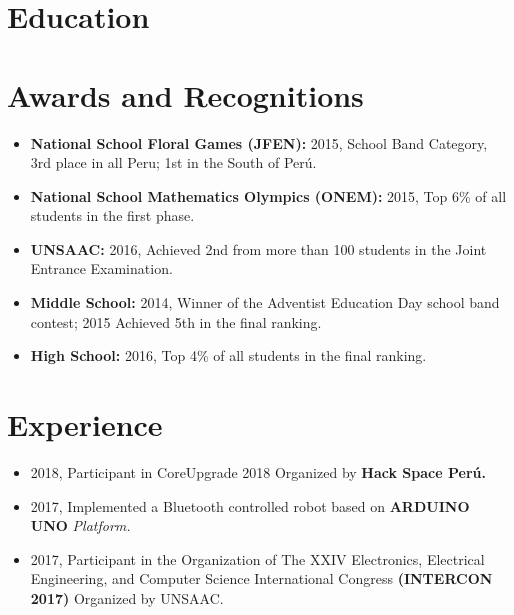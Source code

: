 \documentclass[11pt,a4paper,sans]{moderncv}        %
\begin{document}
\makecvtitle
\section{Education}



\section{Awards and Recognitions}
\begin{itemize}
\item{\textbf{National School Floral Games (JFEN): } 2015, School Band Category, 3rd place in all Peru; 1st in the South of Perú.}
\item{\textbf{National School Mathematics Olympics (ONEM): } 2015, Top 6\% of all students in the first phase.} 
\item{\textbf{UNSAAC: } 2016, Achieved 2nd from more than 100 students in the Joint Entrance Examination.}
\item{\textbf{Middle School: }2014, Winner of the Adventist Education Day school band contest; 2015 Achieved 5th in the final ranking.}
\item{\textbf{High School: } 2016, Top 4\% of all students in the final ranking.} 
\end{itemize}
\section{Experience}
\begin{itemize}
\item{2018, Participant in CoreUpgrade 2018 Organized by }\textbf{Hack Space Perú.} 
\item{2017, Implemented a Bluetooth controlled robot based on }\textbf{ARDUINO UNO }\textit{Platform.} 
\item{2017, Participant in the Organization of The XXIV Electronics, Electrical Engineering, and Computer Science International Congress }\textbf{(INTERCON 2017)}{ Organized by UNSAAC.} 
\end{itemize}
\end{document}
